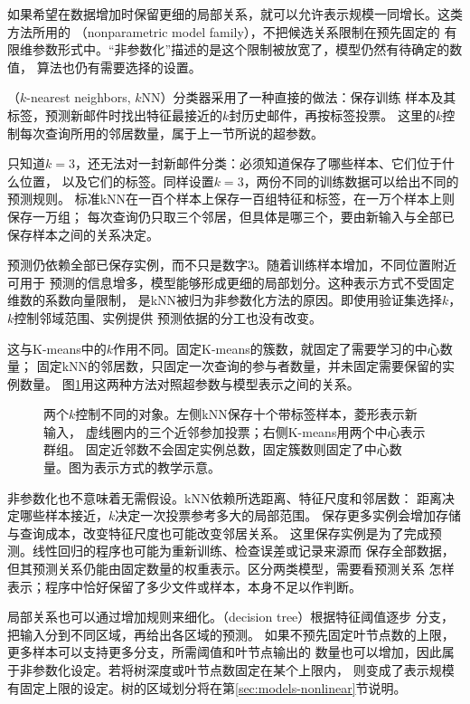 如果希望在数据增加时保留更细的局部关系，就可以允许表示规模一同增长。这类方法所用的
（nonparametric model family），不把候选关系限制在预先固定的
有限维参数形式中。“非参数化”描述的是这个限制被放宽了，模型仍然有待确定的数值，
算法也仍有需要选择的设置。

（$k$-nearest neighbors, $k$NN）分类器采用了一种直接的做法：保存训练
样本及其标签，预测新邮件时找出特征最接近的$k$封历史邮件，再按标签投票。
这里的$k$控制每次查询所用的邻居数量，属于上一节所说的超参数。

只知道$k=3$，还无法对一封新邮件分类：必须知道保存了哪些样本、它们位于什么位置，
以及它们的标签。同样设置$k=3$，两份不同的训练数据可以给出不同的预测规则。
标准kNN在一百个样本上保存一百组特征和标签，在一万个样本上则保存一万组；
每次查询仍只取三个邻居，但具体是哪三个，要由新输入与全部已保存样本之间的关系决定。

预测仍依赖全部已保存实例，而不只是数字$3$。随着训练样本增加，不同位置附近可用于
预测的信息增多，模型能够形成更细的局部划分。这种表示方式不受固定维数的系数向量限制，
是kNN被归为非参数化方法的原因。即使用验证集选择$k$，$k$控制邻域范围、实例提供
预测依据的分工也没有改变。

这与K-means中的$k$作用不同。固定K-means的簇数，就固定了需要学习的中心数量；
固定kNN的邻居数，只固定一次查询的参与者数量，并未固定需要保留的实例数量。
图\ref{fig:models-neighbors-prototypes}用这两种方法对照超参数与模型表示之间的关系。

\begin{figure}[htbp]
  \centering
  
  \caption{两个$k$控制不同的对象。左侧kNN保存十个带标签样本，菱形表示新输入，
  虚线圈内的三个近邻参加投票；右侧K-means用两个中心表示群组。
  固定近邻数不会固定实例总数，固定簇数则固定了中心数量。图为表示方式的教学示意。}
  \label{fig:models-neighbors-prototypes}
\end{figure}

非参数化也不意味着无需假设。kNN依赖所选距离、特征尺度和邻居数：
距离决定哪些样本接近，$k$决定一次投票参考多大的局部范围。
保存更多实例会增加存储与查询成本，改变特征尺度也可能改变邻居关系。
这里保存实例是为了完成预测。线性回归的程序也可能为重新训练、检查误差或记录来源而
保存全部数据，但其预测关系仍能由固定数量的权重表示。区分两类模型，需要看预测关系
怎样表示；程序中恰好保留了多少文件或样本，本身不足以作判断。

局部关系也可以通过增加规则来细化。（decision tree）根据特征阈值逐步
分支，把输入分到不同区域，再给出各区域的预测。
如果不预先固定叶节点数的上限，更多样本可以支持更多分支，所需阈值和叶节点输出的
数量也可以增加，因此属于非参数化设定。若将树深度或叶节点数固定在某个上限内，
则变成了表示规模有固定上限的设定。树的区域划分将在第\ref{sec:models-nonlinear}节说明。

